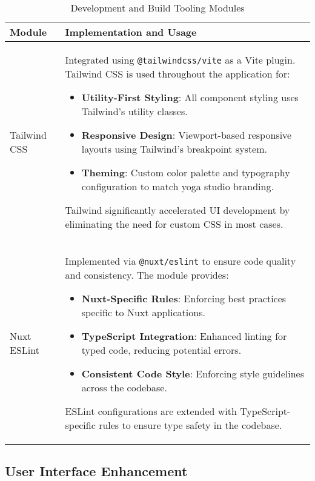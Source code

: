 \begin{table}[H]
    \centering
    \setlength{\tabcolsep}{5pt}
    \renewcommand{\arraystretch}{1.2} 
    \begin{tabular}{|p{3.5cm}|p{10.8cm}|}
        \hline
        \rowcolor{bluepoli!20}
        \textbf{Module} & \textbf{Implementation and Usage} \\
        \hline
        Tailwind CSS & 
        Integrated using \texttt{@tailwindcss/vite} as a Vite plugin. Tailwind CSS is used throughout the application for:
        \begin{itemize}
            \item \textbf{Utility-First Styling}: All component styling uses Tailwind's utility classes.
            \item \textbf{Responsive Design}: Viewport-based responsive layouts using Tailwind's breakpoint system.
            \item \textbf{Theming}: Custom color palette and typography configuration to match yoga studio branding.
        \end{itemize}
        Tailwind significantly accelerated UI development by eliminating the need for custom CSS in most cases.
        \\
        \hline
        Nuxt ESLint & 
        Implemented via \texttt{@nuxt/eslint} to ensure code quality and consistency. The module provides:
        \begin{itemize}
            \item \textbf{Nuxt-Specific Rules}: Enforcing best practices specific to Nuxt applications.
            \item \textbf{TypeScript Integration}: Enhanced linting for typed code, reducing potential errors.
            \item \textbf{Consistent Code Style}: Enforcing style guidelines across the codebase.
        \end{itemize}
        ESLint configurations are extended with TypeScript-specific rules to ensure type safety in the codebase.
        \\
        \hline
    \end{tabular}
    \caption{Development and Build Tooling Modules}
\end{table}

\subsection{User Interface Enhancement}

